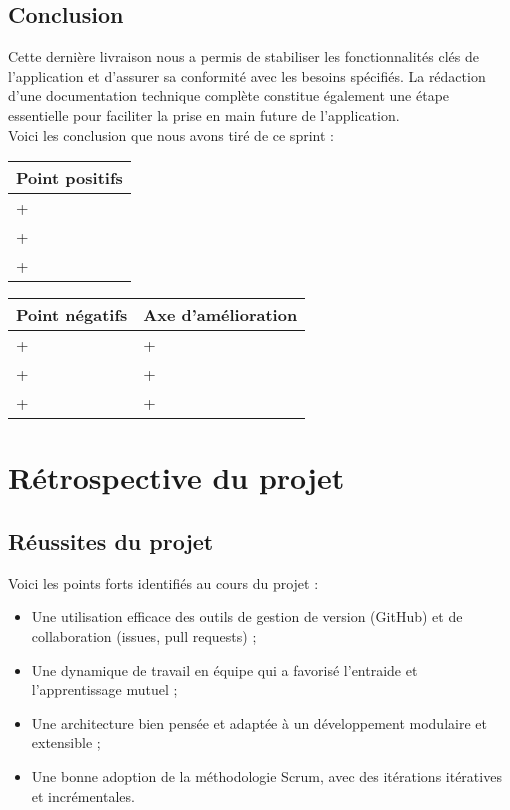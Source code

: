 \documentclass[a4paper]{article}
\begin{document}
\subsection{Conclusion}
Cette dernière livraison nous a permis de stabiliser les fonctionnalités clés de l'application et d'assurer sa conformité avec les besoins spécifiés. La rédaction d'une documentation technique complète constitue également une étape essentielle pour faciliter la prise en main future de l'application.\\
\newline
Voici les conclusion que nous avons tiré de ce sprint :
    \begin{table}[H]
    \centering
    \begin{tabularx}{\textwidth}{|X|}
    \hline
    \textbf{Point positifs} \\ \hline
    + \\ \hline
    + \\ \hline
    + \\ \hline
    \end{tabularx}
    \end{table}

    \begin{table}[H]
    \centering
    \begin{tabularx}{\textwidth}{|X|X|}
    \hline
    \textbf{Point négatifs} & \textbf{Axe d'amélioration} \\ \hline
    + & + \\ \hline
    + & + \\ \hline
    + & + \\ \hline
    \end{tabularx}
    \end{table}


\newpage
\section{Rétrospective du projet}

\subsection{Réussites du projet}
Voici les points forts identifiés au cours du projet :

\begin{itemize}
    \item Une utilisation efficace des outils de gestion de version (GitHub) et de collaboration (issues, pull requests) ;
    \item Une dynamique de travail en équipe qui a favorisé l'entraide et l'apprentissage mutuel ;
    \item Une architecture bien pensée et adaptée à un développement modulaire et extensible ;
    \item Une bonne adoption de la méthodologie Scrum, avec des itérations itératives et incrémentales.
\end{itemize}
\end{document}
